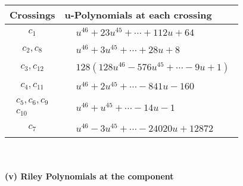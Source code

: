 \documentclass[1p]{elsarticle_modified}
\theoremstyle{definition}
\begin{document}
\begin{tabular}{m{50pt}|m{274pt}}
Crossings & \hspace{64pt}u-Polynomials at each crossing \\
\hline $$\begin{aligned}c_{1}\end{aligned}$$&$\begin{aligned}
&u^{46}+23 u^{45}+\cdots+112 u+64
\end{aligned}$\\
\hline $$\begin{aligned}c_{2},c_{8}\end{aligned}$$&$\begin{aligned}
&u^{46}+3 u^{45}+\cdots+28 u+8
\end{aligned}$\\
\hline $$\begin{aligned}c_{3},c_{12}\end{aligned}$$&$\begin{aligned}
&128(128 u^{46}-576 u^{45}+\cdots-9 u+1)
\end{aligned}$\\
\hline $$\begin{aligned}c_{4},c_{11}\end{aligned}$$&$\begin{aligned}
&u^{46}+2 u^{45}+\cdots-841 u-160
\end{aligned}$\\
\hline $$\begin{aligned}c_{5},c_{6},c_{9}\\c_{10}\end{aligned}$$&$\begin{aligned}
&u^{46}+u^{45}+\cdots-14 u-1
\end{aligned}$\\
\hline $$\begin{aligned}c_{7}\end{aligned}$$&$\begin{aligned}
&u^{46}-3 u^{45}+\cdots-24020 u+12872
\end{aligned}$\\
\hline
\end{tabular}\\~\\
\newpage\renewcommand{\arraystretch}{1}
\flushleft \textbf{(v) Riley Polynomials at the component}\newline \\
\end{document}
